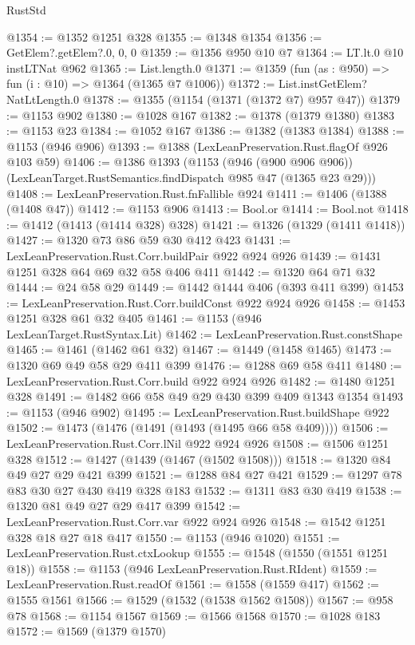 \begin{lexlean}{RustStd}
\begin{coremodule}
@1354 := @1352 @1251 @328
@1355 := @1348 @1354
@1356 := GetElem?.getElem?.{0, 0, 0}
@1359 := @1356 @950 @10 @7
@1364 := LT.lt.{0} @10 instLTNat @962
@1365 := List.length.{0}
@1371 := @1359 (fun (as : @950) => fun (i : @10) => @1364 (@1365 @7 @1006))
@1372 := List.instGetElem?NatLtLength.{0}
@1378 := @1355 (@1154 (@1371 (@1372 @7) @957 @47))
@1379 := @1153 @902
@1380 := @1028 @167
@1382 := @1378 (@1379 @1380)
@1383 := @1153 @23
@1384 := @1052 @167
@1386 := @1382 (@1383 @1384)
@1388 := @1153 (@946 @906)
@1393 := @1388 (LexLeanPreservation.Rust.flagOf @926 @103 @59)
@1406 := @1386
    @1393
    (@1153
      (@946 (@900 @906 @906))
      (LexLeanTarget.RustSemantics.findDispatch @985 @47 (@1365 @23 @29)))
@1408 := LexLeanPreservation.Rust.fnFallible @924
@1411 := @1406 (@1388 (@1408 @47))
@1412 := @1153 @906
@1413 := Bool.or
@1414 := Bool.not
@1418 := @1412 (@1413 (@1414 @328) @328)
@1421 := @1326 (@1329 (@1411 @1418))
@1427 := @1320 @73 @86 @59 @30 @412 @423
@1431 := LexLeanPreservation.Rust.Corr.buildPair @922 @924 @926
@1439 := @1431 @1251 @328 @64 @69 @32 @58 @406 @411
@1442 := @1320 @64 @71 @32
@1444 := @24 @58 @29
@1449 := @1442 @1444 @406 (@393 @411 @399)
@1453 := LexLeanPreservation.Rust.Corr.buildConst @922 @924 @926
@1458 := @1453 @1251 @328 @61 @32 @405
@1461 := @1153 (@946 LexLeanTarget.RustSyntax.Lit)
@1462 := LexLeanPreservation.Rust.constShape
@1465 := @1461 (@1462 @61 @32)
@1467 := @1449 (@1458 @1465)
@1473 := @1320 @69 @49 @58 @29 @411 @399
@1476 := @1288 @69 @58 @411
@1480 := LexLeanPreservation.Rust.Corr.build @922 @924 @926
@1482 := @1480 @1251 @328
@1491 := @1482 @66 @58 @49 @29 @430 @399 @409 @1343 @1354
@1493 := @1153 (@946 @902)
@1495 := LexLeanPreservation.Rust.buildShape @922
@1502 := @1473 (@1476 (@1491 (@1493 (@1495 @66 @58 @409))))
@1506 := LexLeanPreservation.Rust.Corr.lNil @922 @924 @926
@1508 := @1506 @1251 @328
@1512 := @1427 (@1439 (@1467 (@1502 @1508)))
@1518 := @1320 @84 @49 @27 @29 @421 @399
@1521 := @1288 @84 @27 @421
@1529 := @1297 @78 @83 @30 @27 @430 @419 @328 @183
@1532 := @1311 @83 @30 @419
@1538 := @1320 @81 @49 @27 @29 @417 @399
@1542 := LexLeanPreservation.Rust.Corr.var @922 @924 @926
@1548 := @1542 @1251 @328 @18 @27 @18 @417
@1550 := @1153 (@946 @1020)
@1551 := LexLeanPreservation.Rust.ctxLookup
@1555 := @1548 (@1550 (@1551 @1251 @18))
@1558 := @1153 (@946 LexLeanPreservation.Rust.RIdent)
@1559 := LexLeanPreservation.Rust.readOf
@1561 := @1558 (@1559 @417)
@1562 := @1555 @1561
@1566 := @1529 (@1532 (@1538 @1562 @1508))
@1567 := @958 @78
@1568 := @1154 @1567
@1569 := @1566 @1568
@1570 := @1028 @183
@1572 := @1569 (@1379 @1570)

\end{coremodule}
\end{lexlean}
